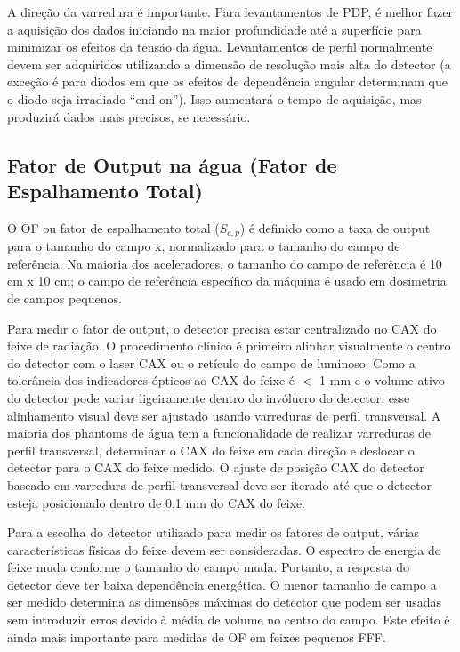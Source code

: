 \documentclass[11pt,a4paper]{article}
\begin{document}
	A direção da varredura é importante. Para levantamentos de PDP, é melhor fazer a aquisição dos dados iniciando na maior profundidade até a superfície para minimizar os efeitos da tensão da água. Levantamentos de perfil normalmente devem ser adquiridos utilizando a dimensão de resolução mais alta do detector (a exceção é para diodos em que os efeitos de dependência angular determinam que o diodo seja irradiado “end on”). Isso aumentará o tempo de aquisição, mas produzirá dados mais precisos, se necessário.

\subsection{Fator de Output na água (Fator de Espalhamento Total)}

	O OF ou fator de espalhamento total ($S_{c,p}$) é definido como a taxa de output para o tamanho do campo x, normalizado para o tamanho do campo de referência. Na maioria dos aceleradores, o tamanho do campo de referência é 10 cm x 10 cm; o campo de referência específico da máquina é usado em dosimetria de campos pequenos.

	Para medir o fator de output, o detector precisa estar centralizado no CAX do feixe de radiação. O procedimento clínico é primeiro alinhar visualmente o centro do detector com o  laser CAX ou o retículo do campo de luminoso. Como a tolerância dos indicadores ópticos  ao CAX do feixe é $<$ 1 mm e o volume ativo do detector pode variar ligeiramente dentro do invólucro do detector, esse alinhamento visual deve ser ajustado usando varreduras de perfil transversal. A maioria dos phantoms de água tem a funcionalidade de realizar varreduras de perfil transversal, determinar o CAX do feixe em cada direção e deslocar o detector para o CAX do feixe medido. O ajuste de posição CAX do detector baseado em varredura de perfil transversal deve ser iterado até que o detector esteja posicionado dentro de 0,1 mm do CAX do feixe.

	Para a escolha do detector utilizado para medir os fatores de output, várias características físicas do feixe devem ser consideradas. O espectro de energia do feixe muda conforme o tamanho do campo muda. Portanto, a resposta do detector deve ter baixa dependência energética. O menor tamanho de campo a ser medido determina as dimensões máximas do detector que podem ser usadas sem introduzir erros devido à média de volume no centro do campo. Este efeito é ainda mais importante para medidas de OF em feixes pequenos FFF.
\end{document}
